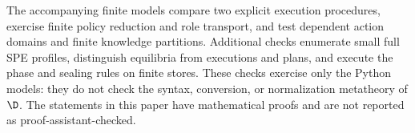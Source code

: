 The accompanying finite models compare two explicit execution procedures,
exercise finite policy reduction and role transport, and test dependent
action domains and finite knowledge partitions. Additional checks enumerate
small full SPE profiles, distinguish equilibria from executions and plans,
and execute the phase and sealing rules on finite stores.
These checks exercise only the Python models: they do not check the syntax,
conversion, or normalization metatheory of $\D$. The statements in this
paper have mathematical proofs and are not reported as proof-assistant-checked.
